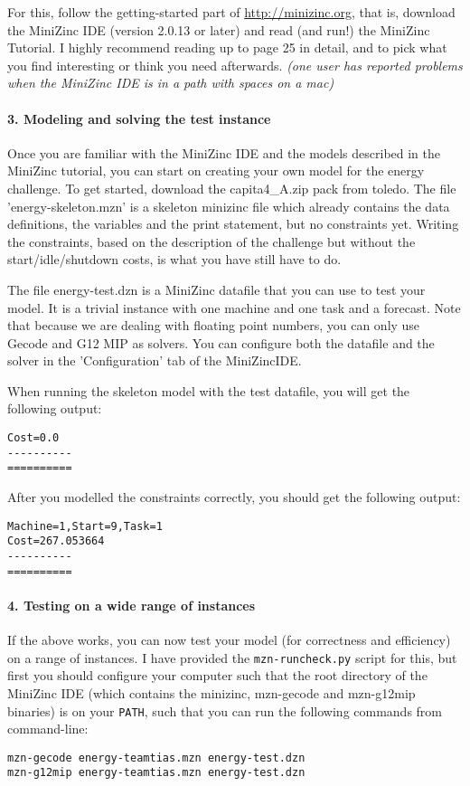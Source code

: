\documentclass[a4,12pt]{article}
\begin{document}
For this, follow the getting-started part of \url{http://minizinc.org}, that is, download the MiniZinc IDE (version 2.0.13 or later) and read (and run!) the MiniZinc Tutorial. I highly recommend reading up to page 25 in detail, and to pick what you find interesting or think you need afterwards. \textit{(one user has reported problems when the MiniZinc IDE is in a path with spaces on a mac)}

\paragraph{3. Modeling and solving the test instance}
Once you are familiar with the MiniZinc IDE and the models described in the MiniZinc tutorial, you can start on creating your own model for the energy challenge. To get started, download the capita4\_A.zip pack from toledo. The file 'energy-skeleton.mzn' is a skeleton minizinc file which already contains the data definitions, the variables and the print statement, but no constraints yet. Writing the constraints, based on the description of the challenge but without the start/idle/shutdown costs, is what you have still have to do.

The file energy-test.dzn is a MiniZinc datafile that you can use to test your model. It is a trivial instance with one machine and one task and a forecast. Note that because we are dealing with floating point numbers, you can only use Gecode and G12 MIP as solvers. You can configure both the datafile and the solver in the 'Configuration' tab of the MiniZincIDE.

When running the skeleton model with the test datafile, you will get the following output:
\begin{verbatim}
Cost=0.0
----------
==========
\end{verbatim}

After you modelled the constraints correctly, you should get the following output:
\begin{verbatim}
Machine=1,Start=9,Task=1
Cost=267.053664
----------
==========
\end{verbatim}

\paragraph{4. Testing on a wide range of instances}
If the above works, you can now test your model (for correctness and efficiency) on a range of instances. I have provided the \texttt{mzn-runcheck.py} script for this, but first you should configure your computer such that the root directory of the MiniZinc IDE (which contains the minizinc, mzn-gecode and mzn-g12mip binaries) is on your \texttt{PATH}, such that you can run the following commands from command-line:
\begin{verbatim}
mzn-gecode energy-teamtias.mzn energy-test.dzn
mzn-g12mip energy-teamtias.mzn energy-test.dzn
\end{verbatim}
\end{document}
